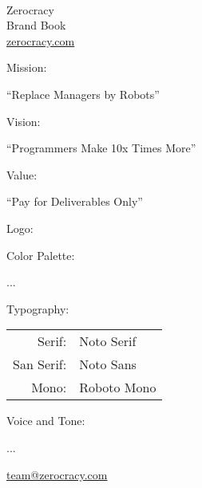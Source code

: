 \documentclass{article}
\date{\today}
\newcommand\slide[1]{%
  \pagebreak\topskip0pt\vspace*{\fill}%
  \begin{center}\LARGE%
  #1
  \end{center}%
  \vspace*{\fill}}
\begin{document}
\setlength{\parindent}{0pt} %

\sffamily


\newcommand\header[1]{{\LARGE #1:\\[1em]\par}}

\slide{%
  \\
  Zerocracy
  \\[1em]
  \large
  Brand Book\\
  \href{https://www.zerocracy.com}{zerocracy.com}}

\slide{
  \header{Mission}
  \par
  {\Huge \enquote{Replace Managers by Robots}\par}}

\slide{
  \header{Vision}
  \par
  {\Huge \enquote{Programmers Make 10x Times More}\par}}

\slide{
  \header{Value}
  \par
  {\Huge \enquote{Pay for Deliverables Only}\par}}

\slide{
  \header{Logo}
  \par
  }

\slide{
  \header{Color Palette}
  \par
  ...}

\slide{
  \header{Typography}
  \par
  \begin{tabular}{rl}
  \toprule
  Serif: & {\rmfamily Noto Serif} \\
  San Serif: & {\sffamily Noto Sans} \\
  Mono: & {\ttfamily Roboto Mono} \\
  \bottomrule
  \end{tabular}}

\slide{
  \header{Voice and Tone}
  \par
  ...}

\slide{%
  \href{mailto:team@zerocracy.com}{team@zerocracy.com}}
\end{document}
